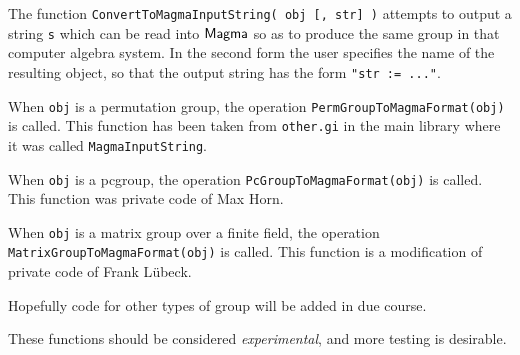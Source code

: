 \documentclass[a4paper,11pt]{report}
\begin{document}
{{{ The function \texttt{ConvertToMagmaInputString( obj [, str] )} attempts to output a string \texttt{s} which can be read into ${\sf Magma}$ \cite{MAGMA} so as to produce the same group in that computer algebra system. In the second
form the user specifies the name of the resulting object, so that the output
string has the form \texttt{"str := ..."}. 

 When \texttt{obj} is a permutation group, the operation \texttt{PermGroupToMagmaFormat(obj)} is called.  This function has been taken from \texttt{other.gi} in the main library where it was called \texttt{MagmaInputString}. 

 When \texttt{obj} is a pc\texttt{}group, the operation \texttt{PcGroupToMagmaFormat(obj)} is called.  This function was private code of Max Horn. 

 When \texttt{obj} is a matrix group over a finite field, the operation \texttt{MatrixGroupToMagmaFormat(obj)} is called.  This function is a modification of private code of Frank L{\"u}beck. 

 Hopefully code for other types of group will be added in due course. 

 These functions should be considered \emph{experimental}, and more testing is desirable. 

}}}
\end{document}
